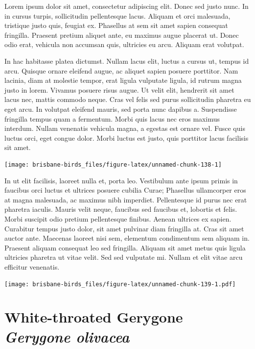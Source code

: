 \documentclass[]{book}
\let\origfigure\figure
\let\endorigfigure\endfigure
\renewenvironment{figure}[1][2] {
  \expandafter\origfigure\expandafter[H]
} {
  \endorigfigure
}
\begin{document}
Lorem ipsum dolor sit amet, consectetur adipiscing elit. Donec sed justo
nunc. In in cursus turpis, sollicitudin pellentesque lacus. Aliquam et
orci malesuada, tristique justo quis, feugiat ex. Phasellus at sem sit
amet sapien consequat fringilla. Praesent pretium aliquet ante, eu
maximus augue placerat ut. Donec odio erat, vehicula non accumsan quis,
ultricies eu arcu. Aliquam erat volutpat.

In hac habitasse platea dictumst. Nullam lacus elit, luctus a cursus ut,
tempus id arcu. Quisque ornare eleifend augue, ac aliquet sapien posuere
porttitor. Nam lacinia, diam at molestie tempor, erat ligula vulputate
ligula, id rutrum magna justo in lorem. Vivamus posuere risus augue. Ut
velit elit, hendrerit sit amet lacus nec, mattis commodo neque. Cras vel
felis sed purus sollicitudin pharetra eu eget arcu. In volutpat eleifend
mauris, sed porta nunc dapibus a. Suspendisse fringilla tempus quam a
fermentum. Morbi quis lacus nec eros maximus interdum. Nullam venenatis
vehicula magna, a egestas est ornare vel. Fusce quis luctus orci, eget
congue dolor. Morbi luctus est justo, quis porttitor lacus facilisis sit
amet.

\begin{figure}
\texttt{[image: brisbane-birds\_files/figure-latex/unnamed-chunk-138-1]} \caption{insert figure caption}\label{fig:unnamed-chunk-138}
\end{figure}

In ut elit facilisis, laoreet nulla et, porta leo. Vestibulum ante ipsum
primis in faucibus orci luctus et ultrices posuere cubilia Curae;
Phasellus ullamcorper eros at magna malesuada, ac maximus nibh
imperdiet. Pellentesque id purus nec erat pharetra iaculis. Mauris velit
neque, faucibus sed faucibus et, lobortis et felis. Morbi suscipit odio
pretium pellentesque finibus. Aenean ultrices ex sapien. Curabitur
tempus justo dolor, sit amet pulvinar diam fringilla at. Cras sit amet
auctor ante. Maecenas laoreet nisi sem, elementum condimentum sem
aliquam in. Praesent aliquam consequat leo sed fringilla. Aliquam sit
amet metus quis ligula ultricies pharetra ut vitae velit. Sed sed
vulputate mi. Nullam et elit vitae arcu efficitur venenatis.

\begin{figure}
\centering
\texttt{[image: brisbane-birds\_files/figure-latex/unnamed-chunk-139-1.pdf]}
\caption{\label{fig:unnamed-chunk-139}insert figure caption}
\end{figure}

\section{\texorpdfstring{White-throated Gerygone \emph{Gerygone
olivacea}}{White-throated Gerygone Gerygone olivacea}}\label{white-throated-gerygone-gerygone-olivacea}
\end{document}
